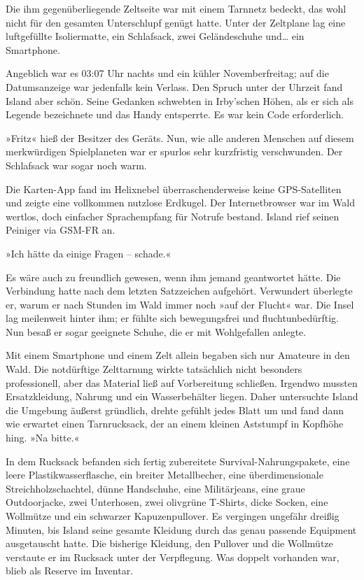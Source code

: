 Die ihm gegenüberliegende Zeltseite war mit einem Tarnnetz bedeckt, das wohl nicht für den gesamten Unterschlupf genügt hatte. Unter der Zeltplane lag eine luftgefüllte Isoliermatte, ein Schlafsack, zwei Geländeschuhe und… ein Smartphone.


Angeblich war es 03:07 Uhr nachts und ein kühler Novemberfreitag; auf die Datumsanzeige war jedenfalls kein Verlass. Den Spruch unter der Uhrzeit fand Island aber schön. Seine Gedanken schwebten in Irby'schen Höhen, als er sich als Legende bezeichnete und das Handy entsperrte. Es war kein Code erforderlich.

»Fritz« hieß der Besitzer des Geräts. Nun, wie alle anderen Menschen auf diesem merkwürdigen Spielplaneten war er spurlos sehr kurzfristig verschwunden. Der Schlafsack war sogar noch warm.

Die Karten-App fand im Helixnebel überraschenderweise keine GPS-Satelliten und zeigte eine vollkommen nutzlose Erdkugel. Der Internetbrowser war im Wald wertlos, doch einfacher Sprachempfang für Notrufe bestand. Island rief seinen Peiniger via GSM-FR an.


»Ich hätte da einige Fragen – schade.«

Es wäre auch zu freundlich gewesen, wenn ihm jemand geantwortet hätte. Die Verbindung hatte nach dem letzten Satzzeichen aufgehört. Verwundert überlegte er, warum er nach Stunden im Wald immer noch »auf der Flucht« war. Die Insel lag meilenweit hinter ihm; er fühlte sich bewegungsfrei und fluchtunbedürftig. Nun besaß er sogar geeignete Schuhe, die er mit Wohlgefallen anlegte.

Mit einem Smartphone und einem Zelt allein begaben sich nur Amateure in den Wald. Die notdürftige Zelttarnung wirkte tatsächlich nicht besonders professionell, aber das Material ließ auf Vorbereitung schließen. Irgendwo mussten Ersatzkleidung, Nahrung und ein Wasserbehälter liegen. Daher untersuchte Island die Umgebung äußerst gründlich, drehte gefühlt jedes Blatt um und fand dann wie erwartet einen Tarnrucksack, der an einem kleinen Aststumpf in Kopfhöhe hing. »Na bitte.«

In dem Rucksack befanden sich fertig zubereitete Survival-Nahrungspakete, eine leere Plastikwasserflasche, ein breiter Metallbecher, eine überdimensionale Streichholzschachtel, dünne Handschuhe, eine Militärjeans, eine graue Outdoorjacke, zwei Unterhosen, zwei olivgrüne T-Shirts, dicke Socken, eine Wollmütze und ein schwarzer Kapuzenpullover. Es vergingen ungefähr dreißig Minuten, bis Island seine gesamte Kleidung durch das genau passende Equipment ausgetauscht hatte. Die bisherige Kleidung, den Pullover und die Wollmütze verstaute er im Rucksack unter der Verpflegung. Was doppelt vorhanden war, blieb als Reserve im Inventar.

